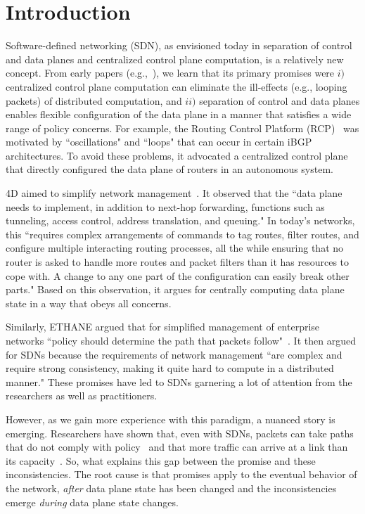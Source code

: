 \section{Introduction}
\label{sec:intro}

Software-defined networking (SDN), as envisioned today in separation of control and data planes and centralized control plane computation, is a relatively new concept.
From early papers (e.g.,~\cite{rcp-case,rcp,4d,ethane}), we learn that its primary promises were $i)$ centralized control plane computation can eliminate the ill-effects (e.g., looping packets) of distributed computation, and $ii)$ separation of control and data planes enables flexible configuration of the data plane in a manner that satisfies a wide range of policy concerns.
For example, the Routing Control Platform (RCP)~\cite{rcp-case,rcp} was motivated by ``oscillations" and ``loops" that can occur in certain iBGP architectures. To avoid these problems, it advocated a centralized control plane that directly configured the data plane of routers in an autonomous system.

4D aimed to simplify network management~\cite{4d}. It observed that the ``data plane needs to implement, in addition to next-hop forwarding, functions such as tunneling, access control, address translation, and queuing." In today's networks, this ``requires complex arrangements of commands to tag routes, filter routes, and configure multiple interacting routing processes, all the while ensuring that no router is asked to handle more routes and packet filters than it has resources to cope with. A change to any one part of the configuration can easily break other parts." Based on this observation, it argues for centrally computing data plane state in a way that obeys all concerns.

Similarly, ETHANE argued that for simplified management of enterprise networks ``policy should determine the path that packets follow"~\cite{ethane}. It then argued for SDNs because the requirements of network management ``are complex and require strong consistency, making it quite hard to compute in a distributed manner." These promises have led to SDNs garnering a lot of attention from the researchers as well as practitioners.

However, as we gain more experience with this paradigm, a nuanced story is emerging.  Researchers have shown that, even with SDNs, packets can take paths that do not comply with policy~\cite{safeupdate} and that more traffic can arrive at a link than its capacity~\cite{swan}. So, what explains this gap between the promise and these inconsistencies. The root cause is that promises apply to the eventual behavior of the network, {\em after} data plane state has been changed and the inconsistencies emerge {\em during} data plane state changes.

